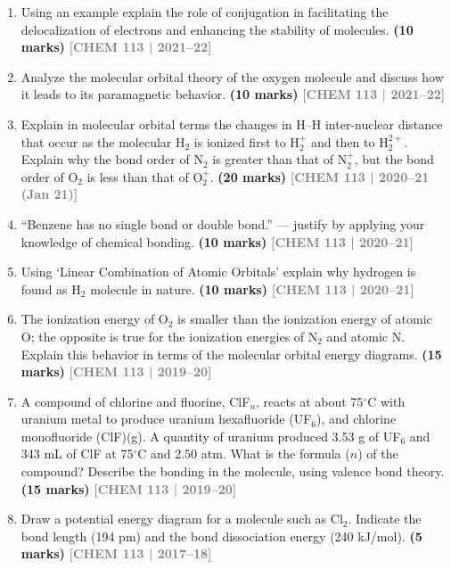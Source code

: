 \documentclass[12pt,a3paper]{article}
\newcommand{\yr}[1]{\hfill\textcolor{gray}{\small\textbf{[#1]}}}
\newcommand{\mk}[1]{\textcolor{orange!70!black}{\small\textbf{(#1 marks)}}}
\begin{document}
\begin{enumerate}
\item Using an example explain the role of conjugation in facilitating the delocalization of electrons and enhancing the stability of molecules. \mk{10}
\yr{CHEM 113 | 2021--22}



\item Analyze the molecular orbital theory of the oxygen molecule and discuss how it leads to its paramagnetic behavior. \mk{10}
\yr{CHEM 113 | 2021--22}



\item Explain in molecular orbital terms the changes in H--H inter-nuclear distance that occur as the molecular H$_2$ is ionized first to H$_2^+$ and then to H$_2^{2+}$. Explain why the bond order of N$_2$ is greater than that of N$_2^+$, but the bond order of O$_2$ is less than that of O$_2^+$. \mk{20}
\yr{CHEM 113 | 2020--21 (Jan 21)}



\item ``Benzene has no single bond or double bond.'' --- justify by applying your knowledge of chemical bonding. \mk{10}
\yr{CHEM 113 | 2020--21}



\item Using `Linear Combination of Atomic Orbitals' explain why hydrogen is found as H$_2$ molecule in nature. \mk{10}
\yr{CHEM 113 | 2020--21}




\item The ionization energy of O$_2$ is smaller than the ionization energy of atomic O; the opposite is true for the ionization energies of N$_2$ and atomic N. Explain this behavior in terms of the molecular orbital energy diagrams. \mk{15}
\yr{CHEM 113 | 2019--20}



\item A compound of chlorine and fluorine, ClF$_n$, reacts at about 75$^\circ$C with uranium metal to produce uranium hexafluoride (UF$_6$), and chlorine monofluoride (ClF)(g). A quantity of uranium produced 3.53 g of UF$_6$ and 343 mL of ClF at 75$^\circ$C and 2.50 atm. What is the formula ($n$) of the compound? Describe the bonding in the molecule, using valence bond theory. \mk{15}
\yr{CHEM 113 | 2019--20}



\item Draw a potential energy diagram for a molecule such as Cl$_2$. Indicate the bond length (194 pm) and the bond dissociation energy (240 kJ/mol). \mk{5}
\yr{CHEM 113 | 2017--18}




\end{enumerate}
\end{document}
